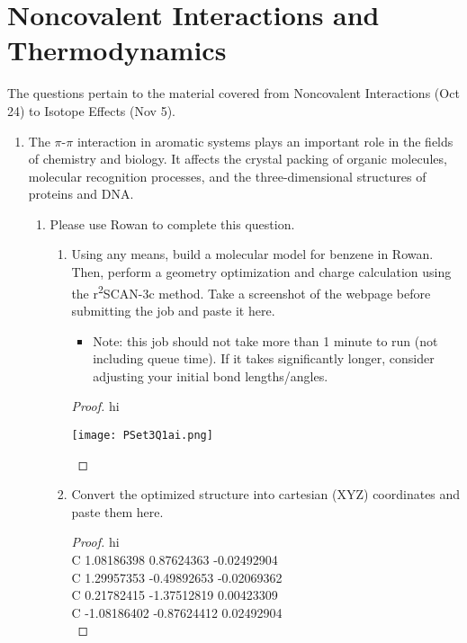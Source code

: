 \documentclass[../psets.tex]{subfiles}
\begin{document}
\section{Noncovalent Interactions and Thermodynamics}
The questions pertain to the material covered from Noncovalent Interactions (Oct 24) to Isotope Effects (Nov 5).
\begin{enumerate}
    \item The $\pi$-$\pi$ interaction in aromatic systems plays an important role in the fields of chemistry and biology. It affects the crystal packing of organic molecules, molecular recognition processes, and the three-dimensional structures of proteins and DNA.
    \begin{enumerate}
        \item Please use Rowan to complete this question.
        \begin{enumerate}
            \item Using any means, build a molecular model for benzene in Rowan. Then, perform a geometry optimization and charge calculation using the r\textsuperscript{2}SCAN-3c method. Take a screenshot of the webpage before submitting the job and paste it here.
            \begin{itemize}
                \item Note: this job should not take more than 1 minute to run (not including queue time). If
                it takes significantly longer, consider adjusting your initial bond lengths/angles.
            \end{itemize}
            \begin{proof}
                {\color{white}hi}
                \begin{center}
                    \texttt{[image: PSet3Q1ai.png]}
                \end{center}
            \end{proof}
            \item Convert the optimized structure into cartesian (XYZ) coordinates and paste them here.
            \begin{proof}
                {\color{white}hi}\\
                C     1.08186398   0.87624363  -0.02492904\\
                C     1.29957353  -0.49892653  -0.02069362\\
                C     0.21782415  -1.37512819   0.00423309\\
                C    -1.08186402  -0.87624412   0.02492904\\

\end{proof}
\end{enumerate}
\end{enumerate}
\end{enumerate}
\end{document}
